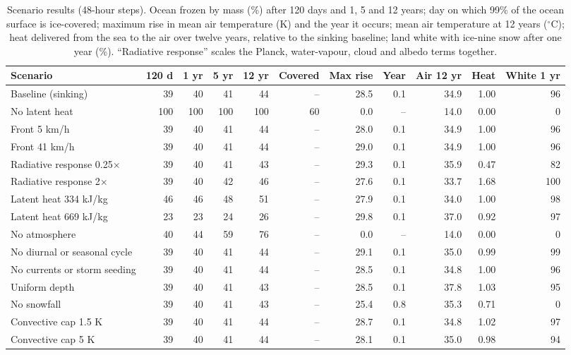 \documentclass[11pt,a4paper]{article}
\newcommand{\degC}{$^{\circ}$C}
\begin{document}
\begin{table}[htbp]
\centering\footnotesize
\caption{Scenario results (48-hour steps). Ocean frozen by mass (\%) after 120 days and 1, 5 and 12 years; day on which 99\% of the ocean surface is ice-covered; maximum rise in mean air temperature (K) and the year it occurs; mean air temperature at 12 years (\degC); heat delivered from the sea to the air over twelve years, relative to the sinking baseline; land white with ice-nine snow after one year (\%). ``Radiative response'' scales the Planck, water-vapour, cloud and albedo terms together.}
\label{tab:scen}
\setlength{\tabcolsep}{3pt}
\begin{tabular}{lrrrrrrrrrr}
\toprule
Scenario & 120 d & 1 yr & 5 yr & 12 yr & Covered & Max rise & Year & Air 12 yr & Heat & White 1 yr \\
\midrule
Baseline (sinking) & 39 & 40 & 41 & 44 & -- & 28.5 & 0.1 & 34.9 & 1.00 & 96 \\
No latent heat & 100 & 100 & 100 & 100 & 60 & 0.0 & -- & 14.0 & 0.00 & 0 \\
Front 5 km/h & 39 & 40 & 41 & 44 & -- & 28.0 & 0.1 & 34.9 & 1.00 & 96 \\
Front 41 km/h & 39 & 40 & 41 & 44 & -- & 29.0 & 0.1 & 34.9 & 1.00 & 96 \\
Radiative response 0.25$\times$ & 39 & 40 & 41 & 43 & -- & 29.3 & 0.1 & 35.9 & 0.47 & 82 \\
Radiative response 2$\times$ & 39 & 40 & 42 & 46 & -- & 27.6 & 0.1 & 33.7 & 1.68 & 100 \\
Latent heat 334 kJ/kg & 46 & 46 & 48 & 51 & -- & 27.9 & 0.1 & 34.0 & 1.00 & 98 \\
Latent heat 669 kJ/kg & 23 & 23 & 24 & 26 & -- & 29.8 & 0.1 & 37.0 & 0.92 & 97 \\
No atmosphere & 40 & 44 & 59 & 76 & -- & 0.0 & -- & 14.0 & 0.00 & 0 \\
No diurnal or seasonal cycle & 39 & 40 & 41 & 44 & -- & 29.1 & 0.1 & 35.0 & 0.99 & 99 \\
No currents or storm seeding & 39 & 40 & 41 & 44 & -- & 28.5 & 0.1 & 34.8 & 1.00 & 96 \\
Uniform depth & 39 & 40 & 41 & 43 & -- & 28.5 & 0.1 & 37.8 & 1.03 & 95 \\
No snowfall & 39 & 40 & 41 & 43 & -- & 25.4 & 0.8 & 35.3 & 0.71 & 0 \\
Convective cap 1.5 K & 39 & 40 & 41 & 44 & -- & 28.7 & 0.1 & 34.8 & 1.02 & 97 \\
Convective cap 5 K & 39 & 40 & 41 & 44 & -- & 28.1 & 0.1 & 35.0 & 0.98 & 94 \\

\end{tabular}
\end{table}
\end{document}
